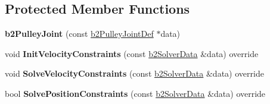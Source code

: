 \subsection*{Protected Member Functions}
\begin{DoxyCompactItemize}
\item 
\mbox{\label{classb2PulleyJoint_aca1b8dc6fb05c134ccbc0423674c1867}} 
{\bfseries b2\+Pulley\+Joint} (const \mbox{\hyperlink{structb2PulleyJointDef}{b2\+Pulley\+Joint\+Def}} $\ast$data)
\item 
\mbox{\label{classb2PulleyJoint_a1826611f1dfe6284c3ce3afdab875e94}} 
void {\bfseries Init\+Velocity\+Constraints} (const \mbox{\hyperlink{structb2SolverData}{b2\+Solver\+Data}} \&data) override
\item 
\mbox{\label{classb2PulleyJoint_a80de874e392a8238fd2e965f5080222b}} 
void {\bfseries Solve\+Velocity\+Constraints} (const \mbox{\hyperlink{structb2SolverData}{b2\+Solver\+Data}} \&data) override
\item 
\mbox{\label{classb2PulleyJoint_ac3d5f78f3bdd248ca368add8f21b7e95}} 
bool {\bfseries Solve\+Position\+Constraints} (const \mbox{\hyperlink{structb2SolverData}{b2\+Solver\+Data}} \&data) override
\end{DoxyCompactItemize}

